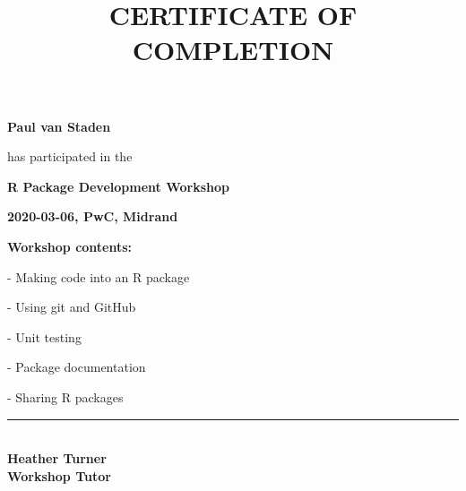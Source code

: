 \documentclass[14pt,a4paper]{extarticle}
\title{CERTIFICATE OF COMPLETION}
\author{}
\date{}
\begin{document}
\maketitle

\begin{center}

\Large \textbf{
Paul van Staden
}

\vspace{1.3cm}

\normalsize
has participated in the

\vspace{0.8cm}

\Large \textbf{
R Package Development Workshop 
}
\normalsize

\large \textbf{
2020-03-06, PwC, Midrand
}
\vspace{0.5cm}

\Large \textbf{
Workshop contents:}

\normalsize
\begin{varwidth}{0.8\textwidth}

- Making code into an R package

- Using git and GitHub

- Unit testing

- Package documentation

- Sharing R packages

\end{varwidth}

\vfill

\rule[0in]{3in}{1pt}\\
\textbf{Heather Turner\\
        Workshop Tutor}\\
\vspace{0.8cm}

\end{center}
\end{document}
